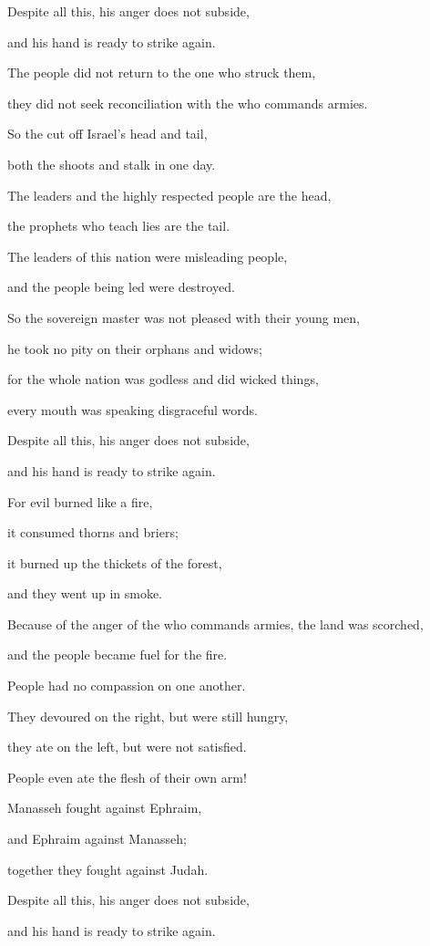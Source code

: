 {\par }{\Q Despite all
this,
his anger
does not
subside,
\par }{\Q and his hand
is ready to strike
again.
\par }{\Q {}The people
did not
return
to
the one who struck
them,
\par }{\Q they did not
seek
reconciliation
with the
{}
who commands armies.
\par }{\Q {}So the
{}
cut off
Israel’s
head
and tail,
\par }{\Q both the shoots
and stalk
in one
day.
\par }{\Q {}The leaders
and the highly
respected people are the head,
\par }{\Q the prophets
who teach
lies
are the tail.
\par }{\Q {}The leaders
of this
nation
were misleading
people,
\par }{\Q and the people being led
were destroyed.
\par }{\Q {}So
the sovereign
master was not pleased
with their young men,
\par }{\Q he took
no
pity
on their orphans
and widows;
\par }{\Q for
the whole
nation was godless
and did wicked
things,

\par }{\Q every
mouth
was speaking
disgraceful words.
\par }{\Q Despite all
this,
his anger
does not
subside,
\par }{\Q and his hand
is ready to strike
again.
\par }{\Q {}For
evil
burned
like a fire,
\par }{\Q it consumed
thorns
and briers;
\par }{\Q it burned up
the thickets
of the forest,
\par }{\Q and they went up
in smoke.
\par }{\Q {}Because of the anger
of the
{}
who commands armies,
the land
was scorched,
\par }{\Q and the people
became fuel
for the fire.
\par }{\Q People
had no
compassion
on
one another.
\par }{\Q {}They devoured
on
the right,
but were still hungry,
\par }{\Q they ate
on
the left,
but were not
satisfied.
\par }{\Q People
even ate
the flesh
of their own arm!
\par }{\Q {}Manasseh
fought against Ephraim,
\par }{\Q and Ephraim
against Manasseh;
\par }{\Q together
they
fought against
Judah.
\par }{\Q Despite all
this,
his anger
does not
subside,
\par }{\Q and his hand
is ready to strike
again.

}
